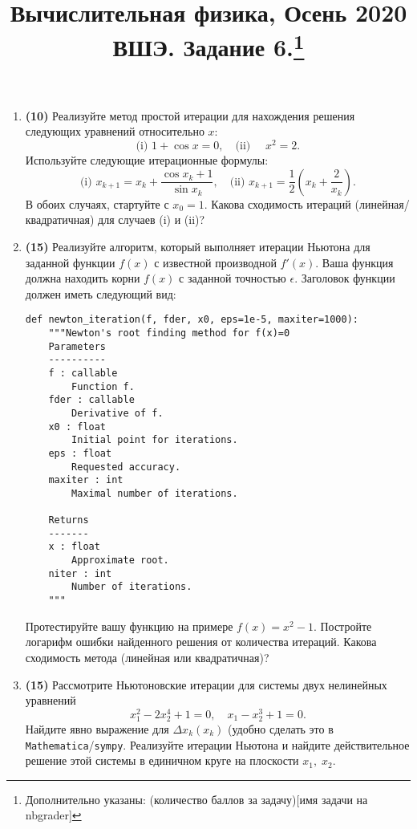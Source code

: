 \documentclass[prb,papersize=a4paper,notitlepage]{revtex4-1}%
\newcommand{\wm}[1]{\texttt{Mathematica}}
\newcommand{\sympy}[1]{\texttt{sympy}}
\begin{document}
\title{Вычислительная физика, Осень 2020 ВШЭ. Задание 6.\footnote{Дополнительно указаны: (количество баллов за задачу)[имя задачи на nbgrader]}}
\maketitle
\begin{enumerate}

\item \textbf{(10)}
Реализуйте метод простой итерации для нахождения решения следующих уравнений относительно $x$:
$$
\textrm{(i) }1+\cos x = 0,\quad\textrm{(ii) }\quad x^2 = 2.
$$
Используйте следующие итерационные формулы:
$$
\textrm{(i) }x_{k+1}=x_k+\frac{\cos x_k + 1}{\sin x_k},\quad\textrm{(ii) }x_{k+1}=\frac{1}{2}\left(x_k+\frac{2}{x_k}\right).
$$
В обоих случаях, стартуйте с $x_0=1$. Какова сходимость итераций (линейная/квадратичная) для случаев (i) и (ii)?

\item \textbf{(15)}
Реализуйте алгоритм, который выполняет итерации Ньютона для заданной функции $f(x)$ с известной производной $f'(x)$. Ваша функция должна находить корни $f(x)$ с заданной точностью $\epsilon$. Заголовок функции должен иметь следующий вид:
\lstset{language=Python}
\lstset{frame=lines}
\lstset{basicstyle=\ttfamily}
\begin{lstlisting}
def newton_iteration(f, fder, x0, eps=1e-5, maxiter=1000):
    """Newton's root finding method for f(x)=0
    Parameters
    ----------
    f : callable
        Function f.
    fder : callable
        Derivative of f.
    x0 : float
        Initial point for iterations.
    eps : float
        Requested accuracy.
    maxiter : int
        Maximal number of iterations.
    
    Returns
    -------
    x : float
        Approximate root.
    niter : int
        Number of iterations.
    """
\end{lstlisting}
Протестируйте вашу функцию на примере $f(x)=x^2-1$. Постройте логарифм ошибки найденного решения от количества итераций. Какова сходимость метода (линейная или квадратичная)?

\item \textbf{(15)}
Рассмотрите Ньютоновские итерации для системы двух нелинейных уравнений 
$$
x_1^2-2x_2^4+1=0,\quad x_1-x_2^3+1=0.
$$
Найдите явно выражение для $\Delta x_k(x_k)$ (удобно сделать это в \wm//\sympy). Реализуйте итерации Ньютона и найдите действительное решение этой системы в единичном круге на плоскости $x_1,\;x_2$.


\end{enumerate}
\end{document}
